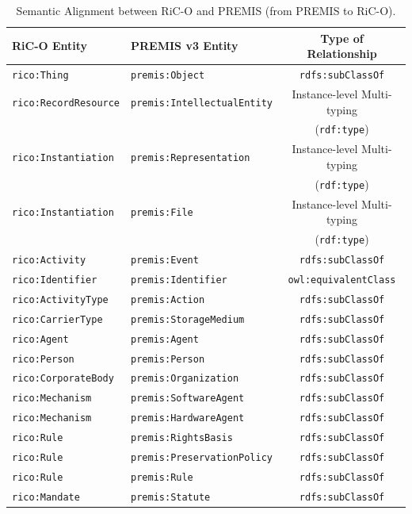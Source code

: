 \documentclass[runningheads]{llncs}
\begin{document}
\begin{table}[ht]
	\begin{center}
		\scriptsize
		\begin{tabular}{l  l  c}
			\hline\hline
			\textbf{RiC-O Entity} & \textbf{PREMIS v3 Entity} & \textbf{Type of Relationship} \\
			\hline\hline
			\texttt{rico:Thing} & 	\texttt{premis:Object} & 	\texttt{rdfs:subClassOf} \\\hline
			\texttt{rico:RecordResource} & \texttt{premis:IntellectualEntity} & Instance-level Multi-typing\\
			&  & (\texttt{rdf:type}) \\
			\hline
			\texttt{rico:Instantiation} & \texttt{premis:Representation} & Instance-level Multi-typing\\
			&  & (\texttt{rdf:type}) \\\hline
			\texttt{rico:Instantiation} & \texttt{premis:File} & Instance-level Multi-typing\\
			&  & (\texttt{rdf:type}) \\\hline
			\texttt{rico:Activity} & \texttt{premis:Event} & \texttt{rdfs:subClassOf} \\\hline
			\texttt{rico:Identifier} & \texttt{premis:Identifier} & \texttt{owl:equivalentClass} \\\hline
			\texttt{rico:ActivityType} & \texttt{premis:Action} & \texttt{rdfs:subClassOf} \\\hline
			\texttt{rico:CarrierType} & \texttt{premis:StorageMedium} & \texttt{rdfs:subClassOf} \\\hline
			\texttt{rico:Agent} & \texttt{premis:Agent} & \texttt{rdfs:subClassOf} \\\hline
			\texttt{rico:Person} & \texttt{premis:Person} & \texttt{rdfs:subClassOf} \\\hline
			\texttt{rico:CorporateBody} & \texttt{premis:Organization} & \texttt{rdfs:subClassOf} \\\hline
			\texttt{rico:Mechanism} & \texttt{premis:SoftwareAgent} & \texttt{rdfs:subClassOf} \\\hline
			\texttt{rico:Mechanism} & \texttt{premis:HardwareAgent} & \texttt{rdfs:subClassOf} \\\hline
			\texttt{rico:Rule} & \texttt{premis:RightsBasis} & \texttt{rdfs:subClassOf} \\\hline
			\texttt{rico:Rule} & \texttt{premis:PreservationPolicy} & \texttt{rdfs:subClassOf} \\\hline
			\texttt{rico:Rule} & \texttt{premis:Rule} & \texttt{rdfs:subClassOf} \\\hline
			\texttt{rico:Mandate} & \texttt{premis:Statute} & \texttt{rdfs:subClassOf} \\\hline
			\hline
		\end{tabular}
	\end{center}
	\caption{Semantic Alignment between RiC-O and PREMIS (from PREMIS to RiC-O).}
	\label{tab:rico-premis-mapping}
\end{table}
\end{document}
